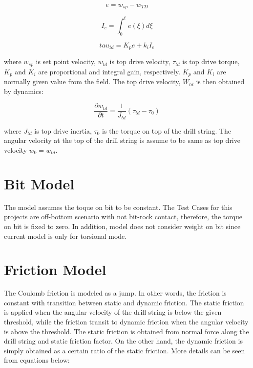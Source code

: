 \begin{equation}\label{AS_err}
  e = w_{sp} - w_{TD}
\end{equation}

\begin{equation}\label{AS_Ie}
  I_e = \int_{0}^{t}e(\xi)d\xi
\end{equation}

\begin{equation}\label{AS_tau_m}
  tau_{td} = K_pe + k_iI_e
\end{equation}

where $w_{sp}$ is set point velocity, $w_{td}$ is top drive velocity, $\tau_{td}$ is top drive torque, $K_p$ and $K_i$ are proportional and integral gain, respectively. $K_p$ and $K_i$ are normally given value from the field. The top drive velocity, $W_{td}$ is then obtained by dynamics:

\begin{equation}\label{AS_w_td}
  \frac{\partial w_{td}}{\partial t} = \frac{1}{J_{td}}(\tau_{td} - \tau_0)
\end{equation}

where $J_{td}$ is top drive inertia, $\tau_{0}$ is the torque on top of the drill string. The angular velocity at the top of the drill string is assume to be same as top drive velocity $w_0 = w_{td}$.

\section{Bit Model}
The model assumes the toque on bit to be constant. The Test Cases for this projects are off-bottom scenario with not bit-rock contact, therefore, the torque on bit is fixed to zero. In addition, model does not consider weight on bit since current model is only for torsional mode. 

\section{Friction Model}
The Coulomb friction is modeled as a jump. In other words, the friction is constant with transition between static and dynamic friction. The static friction is applied when the angular velocity of the drill string is below the given threshold, while the friction transit to dynamic friction when the angular velocity is above the threshold. The static friction is obtained from normal force along the drill string and static friction factor. On the other hand, the dynamic friction is simply obtained as a certain ratio of the static friction. More details can be seen from equations below:

